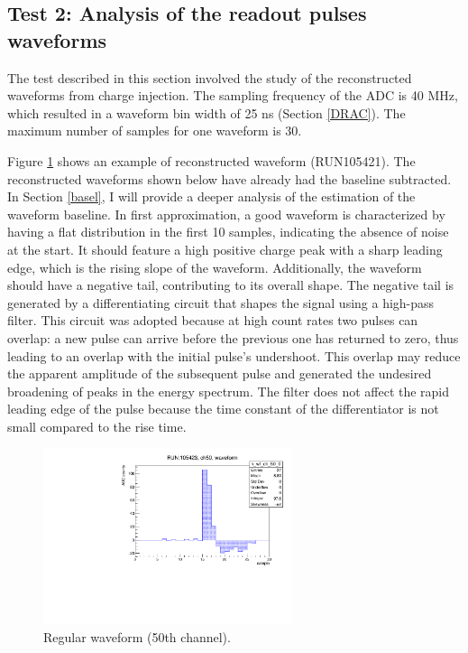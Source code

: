 \subsection{Test 2: Analysis of the readout pulses waveforms}\label{wf}
The test described in this section involved the study 
of the reconstructed waveforms from charge injection. 
The sampling frequency of the ADC is 40 MHz, which resulted 
in a waveform bin width of 25 ns (Section \ref{DRAC}). 
The maximum number of samples for one waveform is 30. 


Figure \ref{fig:normalwf} shows an example 
of reconstructed waveform (RUN105421). 
The reconstructed waveforms shown below 
have already had the baseline subtracted. 
In Section \ref{basel}, I will provide a deeper 
analysis of the estimation of the waveform baseline. 
In first approximation, a good waveform is 
characterized by having a flat 
distribution in the first 10 samples, indicating the 
absence of noise at the start. It should feature a high 
positive charge peak with a sharp leading edge, which is 
the rising slope of the waveform. Additionally, the 
waveform should have a negative tail, contributing to 
its overall shape.
The negative tail is generated by a 
differentiating circuit that shapes the signal 
using a high-pass filter. This circuit was adopted 
because at high count rates two pulses can overlap: a 
new pulse can arrive before the previous one 
has returned to zero, thus leading to an overlap 
with the initial pulse's undershoot. This overlap 
may reduce the apparent amplitude of the subsequent 
pulse and generated the undesired broadening of peaks 
in the energy spectrum. 
The filter does not affect the rapid leading edge 
of the pulse because the time constant of the differentiator 
is not small compared to the rise time.

\begin{figure}[!h]
  \centering
  \includegraphics[width=0.65\textwidth]{figures/pdf/wf_ch50_0.pdf}
  \caption[A regular waveform.]{Regular waveform (50th channel).}
 \label{fig:normalwf}
\end{figure}


